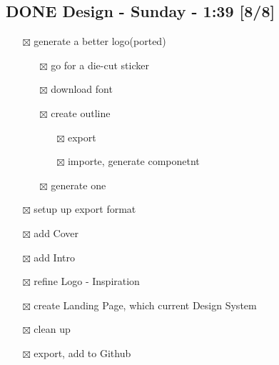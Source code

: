 \documentclass[11pt]{article}
\begin{document}
\subsection{{\bfseries\sffamily DONE} Design - Sunday - 1:39 [8/8]}
\label{sec:org3bf3f80}
\begin{itemize}
\item[{$\boxtimes$}] generate a better logo(ported)
\begin{itemize}
\item[{$\boxtimes$}] go for a die-cut sticker
\item[{$\boxtimes$}] download font
\item[{$\boxtimes$}] create outline
\begin{itemize}
\item[{$\boxtimes$}] export
\item[{$\boxtimes$}] importe, generate componetnt
\end{itemize}
\item[{$\boxtimes$}] generate one
\end{itemize}
\item[{$\boxtimes$}] setup up export format
\item[{$\boxtimes$}] add Cover
\item[{$\boxtimes$}] add Intro
\item[{$\boxtimes$}] refine Logo - Inspiration
\item[{$\boxtimes$}] create Landing Page, which current Design System
\item[{$\boxtimes$}] clean up
\item[{$\boxtimes$}] export, add to Github
\end{itemize}
\end{document}
